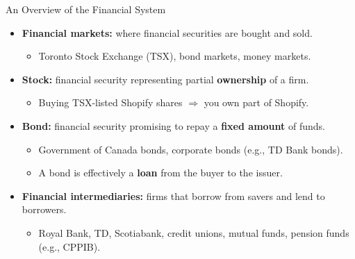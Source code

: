 \documentclass[aspectratio=169]{beamer}
\begin{document}
\begin{frame}{An Overview of the Financial System}
\transfade
\begin{itemize}
  \item \textbf{Financial markets:} where financial securities are bought and sold.
  \begin{itemize}
    \item Toronto Stock Exchange (TSX), bond markets, money markets.
  \end{itemize}
  \item \textbf{Stock:} financial security representing partial \textbf{ownership} of a firm.
  \begin{itemize}
    \item Buying TSX-listed Shopify shares $\Rightarrow$ you own part of Shopify.
  \end{itemize}
  \item \textbf{Bond:} financial security promising to repay a \textbf{fixed amount} of funds.
  \begin{itemize}
    \item Government of Canada bonds, corporate bonds (e.g., TD Bank bonds).
    \item A bond is effectively a \textbf{loan} from the buyer to the issuer.
  \end{itemize}
  \item \textbf{Financial intermediaries:} firms that borrow from savers and lend to borrowers.
  \begin{itemize}
    \item Royal Bank, TD, Scotiabank, credit unions, mutual funds, pension funds (e.g., CPPIB).
  \end{itemize}
\end{itemize}
\end{frame}
\end{document}
